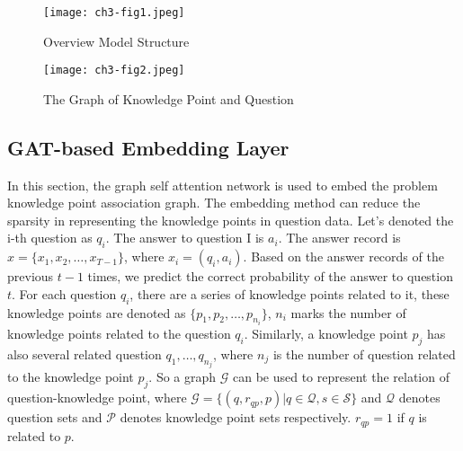 \begin{figure}[h]
	\centering
	\texttt{[image: ch3-fig1.jpeg]}
	\caption{Overview Model Structure}\label{fig:ch3-fig1}
\end{figure}
\begin{figure}[h]
	\centering
	\texttt{[image: ch3-fig2.jpeg]}
	\caption{The Graph of Knowledge Point and Question}\label{fig:ch3-fig2}
\end{figure}


\subsection{GAT-based Embedding Layer}

In this section, the graph self attention network is used to embed the problem knowledge point association graph. The embedding method can reduce the sparsity in representing the knowledge points in question data. Let's denoted the i-th question as \(q_i\). The answer to question I is \(a_i\). The answer record is \(x = \{x_1,x_2,\ldots,x_{T-1}\} \), where \(x_i=(q_i,a_i)\). Based on the answer records of the previous \(t-1\) times, we predict the correct probability of the answer to question \(t\). For each question \(q_i\), there are a series of knowledge points related to it, these knowledge points are denoted as \(\{p_1,p_2,\ldots,p_{n_i}\} \), \(n_i\) marks the number of knowledge points related to the question \(q_i\). Similarly, a knowledge point \(p_j\) has also several related question \(q_1,\ldots,q_{n_j}\), where \(n_j\) is the number of question related to the knowledge point \(p_j\). So a graph \(\mathcal{G}\) can be used to represent the relation of question-knowledge point, where \(\mathcal{G}=\{(q, r_{qp}, p) | q \in \mathcal{Q}, s \in \mathcal{S}\}\) and \(\mathcal{Q}\) denotes question sets and \(\mathcal{P}\) denotes knowledge point sets respectively. \(r_{qp}=1\) if \(q\) is related to \(p\).

